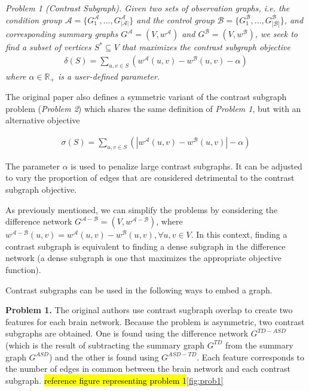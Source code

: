 \documentclass[sigconf]{acmart}
\begin{document}
\emph{Problem 1 (Contrast Subgraph). Given two sets of observation graphs, i.e. the condition group $\mathcal{A} = \{G^{\mathcal{A}}_1, . . . , G^{\mathcal{A}}_{|\mathcal{A}|}\}$ and the control group $\mathcal{B} = \{G^{\mathcal{B}}_1, . . . , G^{\mathcal{B}}_{|\mathcal{B}|}\}$, and corresponding summary graphs $G^{\mathcal{A}} = (V, w^{\mathcal{A}})$ and $G^{\mathcal{B}} = (V, w^{\mathcal{B}})$, we seek to find a subset of vertices $S^* \subseteq V$ that maximizes the contrast subgraph objective}
\begin{align*}
    \delta (S) = \sum_{u,v \in S} \left(w^{\mathcal{A}}(u,v) - w^{\mathcal{B}}(u,v) - \alpha\right)
\end{align*}
\emph{where $\alpha \in \mathbb{R}_+$ is a user-defined parameter.}

The original paper also defines a symmetric variant of the contrast subgraph problem (\emph{Problem 2}) which shares the same definition of \emph{Problem 1}, but with an alternative objective

\begin{align*}
    \sigma (S) = \sum_{u,v \in S} \left(|w^{\mathcal{A}}(u,v) - w^{\mathcal{B}}(u,v)| - \alpha\right)
\end{align*}

The parameter $\alpha$ is used to penalize large contrast subgraphs.
It can be adjusted to vary the proportion of edges that are considered detrimental to the contrast subgraph objective.

As previously mentioned, we can simplify the problems by considering the difference network  $G^{\mathcal{A} - \mathcal{B}} = (V, w^{\mathcal{A} - \mathcal{B}})$, where \\ $w^{\mathcal{A} - \mathcal{B}}(u,v) = w^{\mathcal{A}}(u,v) - w^{\mathcal{B}}(u,v), \forall u,v \in V$.
In this context, finding a contrast subgraph is equivalent to finding a dense subgraph in the difference network (a dense subgraph is one that maximizes the appropriate objective function).

Contrast subgraphs can be used in the following ways to embed a graph.

\textbf{Problem 1.}
The original authors use contrast sugbraph overlap to create two features for each brain network.
Because the problem is asymmetric, two contrast subgraphs are obtained.
One is found using the difference network $G^{TD - ASD}$ (which is the result of subtracting the summary graph $G^{TD}$ from the summary graph $G^{ASD}$) and the other is found using $G^{ASD - TD}$.
Each feature corresponds to the number of edges in common between the brain network and each contrast subgraph.
\hl{reference figure representing problem 1}\ref{fig:prob1} 
\end{document}
